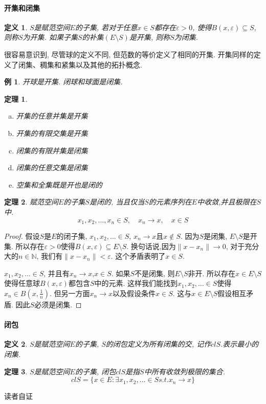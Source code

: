 \documentclass[a4paper,11pt]{article}
\newtheorem{definition}{\hspace{2em}定义}[section]
\newtheorem{theorem}{\hspace{2em}定理}[section]
\newtheorem{proof}{证明}[section]
\newtheorem{example}{例}[section]
\begin{document}
\paragraph*{开集和闭集}
\begin{definition}
  $S$是赋范空间$E$的子集, 若对于任意$x\in S$都存在$\varepsilon>0$, 使得$B(x,\varepsilon)\subseteq S$,则称$S$为开集. 如果子集$S$的补集$(E\setminus S)$是开集, 则称$S$为闭集.
\end{definition}
很容易意识到, 尽管球的定义不同, 但范数的等价定义了相同的开集. 开集同样的定义了闭集、稠集和紧集以及其他的拓扑概念.
\begin{example}
  开球是开集. 闭球和球面是闭集.
\end{example}
\begin{theorem}\quad
\begin{enumerate}[(a)]
  \item 开集的任意并集是开集
  \item 开集的有限交集是开集
  \item 闭集的有限并集是闭集
  \item 闭集的任意交集是闭集
  \item 空集和全集既是开也是闭的
\end{enumerate}
\end{theorem}
\begin{theorem}
  赋范空间$E$的子集$S$是闭的, 当且仅当$S$的元素序列在$E$中收敛,并且极限在$S$中.
  \begin{equation*}
    x_1,x_2,\dots,x_n\in S,\quad x_n\to x,\quad x\in S
  \end{equation*}
\end{theorem}
\begin{proof}
  假设$S$是$E$的闭子集, $x_1,x_2,\dots\in S$, $x_n\to x$且$x\notin S$. 因为$S$是闭集, $E\setminus S$是开集. 所以存在$\varepsilon>0$使得$B(x,\varepsilon)\subseteq E\setminus S$. 换句话说,因为$\|x-x_n\|\to 0$, 对于充分大的$n\in \mathbb{N}$, 我们有$\|x-x_n\|<\varepsilon$. 这个矛盾表明了$x\in S$.

  $x_1,x_2,\dots\in S$, 并且有$x_n\to x$,$x\in S$. 如果$S$不是闭集, 则$E\setminus S$非开. 所以存在$x\in E\setminus S$使得任意球$B(x,\varepsilon)$都包含$S$中的元素. 这样我们能找到$x_1,x_2,\dots\in S$使得$x_n\in B(x,\frac{1}{n})$. 但另一方面$x_n\to x$以及假设条件$x\in S$. 这与$x\in E\setminus S$假设相互矛盾. 因此$S$必须是闭集.
\end{proof}
\paragraph*{闭包}
\begin{definition}
  $S$是赋范空间$E$的子集, $S$的闭包定义为所有闭集的交, 记作$cl S$.表示最小的闭集.
\end{definition}
\begin{theorem}
  $S$是赋范空间$E$的子集, 闭包$cl S$是指$S$中所有收敛列极限的集合.
  \begin{equation*}
    cl S=\{x\in E:\exists x_1,x_2,\dots\in S s.t. x_n\to x\}
  \end{equation*}
\end{theorem}
读者自证
\end{document}
